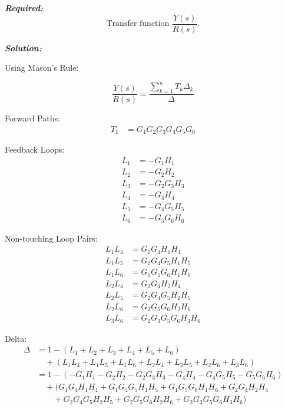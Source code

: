 \documentclass[11pt]{article}
\begin{document}
\vspace{12pt}

\noindent\textbf{\textit{Required:}}
\[
\text{Transfer function } \frac{Y(s)}{R(s)}.
\]

\vspace{12pt}

\noindent \textbf{\textit{Solution:}}

\vspace{2pt}
{Using Mason's Rule:}

\[
\frac{Y(s)}{R(s)} = \frac{\sum_{k=1}^{n} T_k \Delta_k}{\Delta}
\]

Forward Paths:
\begin{align*}
T_1 &= G_1 G_2 G_3 G_4 G_5 G_6
\end{align*}

\vspace{0.5em}

Feedback Loops:
\begin{align*}
L_1 &= -G_1 H_1 \\
L_2 &= -G_2 H_2 \\
L_3 &= -G_2 G_3 H_3 \\
L_4 &= -G_4 H_4 \\
L_5 &= -G_4 G_5 H_5 \\
L_6 &= -G_5 G_6 H_6
\end{align*}

\vspace{0.5em}

Non-touching Loop Pairs:
\begin{align*}
L_1 L_4 &= G_1 G_4 H_1 H_4 \\
L_1 L_5 &= G_1 G_4 G_5 H_1 H_5 \\
L_1 L_6 &= G_1 G_5 G_6 H_1 H_6 \\
L_2 L_4 &= G_2 G_4 H_2 H_4 \\
L_2 L_5 &= G_2 G_4 G_5 H_2 H_5 \\
L_2 L_6 &= G_2 G_5 G_6 H_2 H_6 \\
L_3 L_6 &= G_2 G_3 G_5 G_6 H_3 H_6
\end{align*}

\vspace{0.5em}

Delta:
{\small
\begin{align*}
\Delta &= 1 - (L_1 + L_2 + L_3 + L_4 + L_5 + L_6) \\
&\quad + (L_1 L_4 + L_1 L_5 + L_1 L_6 + L_2 L_4 + L_2 L_5 + L_2 L_6 + L_3 L_6) \\
       &= 1 - (-G_1 H_1 - G_2 H_2 - G_2 G_3 H_3 - G_4 H_4 - G_4 G_5 H_5 - G_5 G_6 H_6) \\
       &\quad + (G_1 G_4 H_1 H_4 + G_1 G_4 G_5 H_1 H_5 + G_1 G_5 G_6 H_1 H_6 + G_2 G_4 H_2 H_4 \\
       &\quad \quad + G_2 G_4 G_5 H_2 H_5 + G_2 G_5 G_6 H_2 H_6 + G_2 G_3 G_5 G_6 H_3 H_6)
\end{align*}
}
\end{document}
